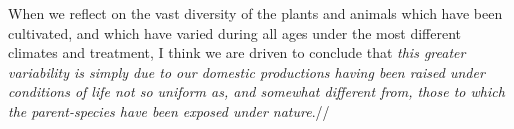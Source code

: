 When we reflect on the vast diversity of the plants and animals which have been cultivated, and which have varied during all ages under the most different climates and treatment, I think we are driven to conclude that \textit{this greater variability is simply due to our domestic productions having been raised under conditions of life not so uniform as, and somewhat different from, those to which the parent-species have been exposed under nature}.//